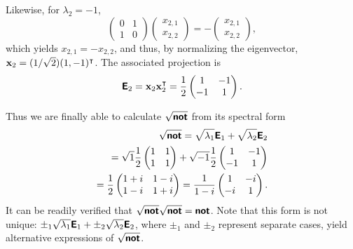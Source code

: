 {Likewise, for $\lambda_2=-1$,
\begin{equation}
\begin{pmatrix}
 0&1\\  1&0
\end{pmatrix}
\begin{pmatrix}
x_{2,1}\\x_{2,2}
\end{pmatrix}
=-\begin{pmatrix}
x_{2,1}\\x_{2,2}
\end{pmatrix}
,
\end{equation}
which yields  $x_{2,1}=-x_{2,2}$, and thus, by normalizing the eigenvector,
${\bf x}_2=(1/\sqrt{2})(1,-1)^\intercal $.
The associated projection is
\begin{equation}
\textsf{\textbf{E}}_2={\bf x}_2{\bf x}_2^\intercal =\frac{1}{2}
\begin{pmatrix}
 1&-1\\  -1&1
\end{pmatrix}
.
\end{equation}

Thus we are finally able to calculate
$\sqrt{\textsf{\textbf{not}}}$
from its spectral form
\begin{equation}
\begin{split}
\sqrt{\textsf{\textbf{not}}}=
\sqrt{\lambda_1}\textsf{\textbf{E}}_1 +
\sqrt{\lambda_2}\textsf{\textbf{E}}_2
\\=  \sqrt{1}
\frac{1}{2} \begin{pmatrix}
 1&1\\  1&1
\end{pmatrix}
+  \sqrt{-1}
\frac{1}{2} \begin{pmatrix}
 1&-1\\  -1&1
\end{pmatrix}
\\
=
\frac{1}{2}
\begin{pmatrix}
 1+i&1-i\\  1-i&1+i
\end{pmatrix}
=
\frac{1}{1-i}
\begin{pmatrix}
 1&-i\\  -i&1
\end{pmatrix}
.
\end{split}
\end{equation}
It can be readily verified that  $\sqrt{\textsf{\textbf{not}}}\sqrt{\textsf{\textbf{not}}}=\textsf{\textbf{not}}$.
Note that this form is not unique:
$\pm_1 \sqrt{\lambda_1}\textsf{\textbf{E}}_1 +
\pm_2 \sqrt{\lambda_2}\textsf{\textbf{E}}_2$, where $\pm_1$ and $\pm_2$ represent separate cases,
yield alternative expressions of $\sqrt{\textsf{\textbf{not}}}$.



\eexample
}

